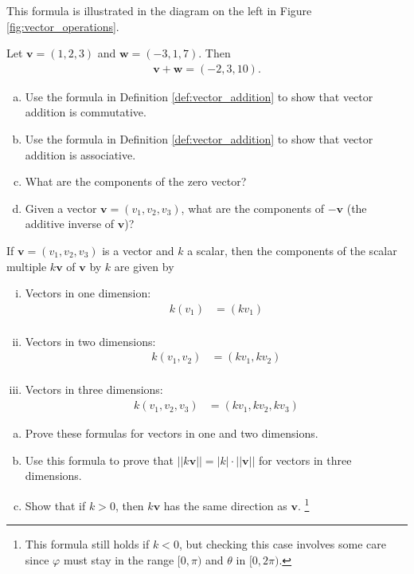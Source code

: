 \documentclass[12pt,letterpaper,reqno]{article}
\numberwithin{equation}{section}
\begin{document}
This formula is illustrated in the diagram on the left in Figure \ref{fig:vector_operations}.

\begin{example}
Let $\mathbf{v}=(1,2,3)$ and $\mathbf{w}=(-3,1,7)$. Then 
\begin{align*}
	\mathbf{v}+\mathbf{w}=(-2,3,10).
\end{align*}	
\end{example}


\begin{exercise}
	\begin{enumerate}[(a)]
		\item Use the formula in Definition \ref{def:vector_addition} to show that vector addition is commutative.
		\item Use the formula in Definition \ref{def:vector_addition} to show that vector addition is associative.
		\item What are the components of the zero vector?
		\item Given a vector $\mathbf{v}=(v_1,v_2,v_3)$, what are the components of $-\mathbf{v}$ (the additive inverse of $\mathbf{v}$)?
	\end{enumerate}
\end{exercise}
\newpage
\begin{prop}\label{prop:scalar_multiple_formula}
If $\mathbf{v}=(v_1,v_2,v_3)$ is a vector and $k$ a scalar, then the components of the scalar multiple $k\mathbf{v}$ of $\mathbf{v}$ by $k$ are given by
\begin{enumerate}[(i)]
	\item Vectors in one dimension:
	\begin{align*}
		k(v_1)&=(kv_1) \\
	\end{align*}
	\item Vectors in two dimensions:
	\begin{align*}
		k(v_1,v_2)&=(kv_1,kv_2) \\
	\end{align*}
	\item Vectors in three dimensions:
	\begin{align*}
		k(v_1,v_2,v_3)&=(kv_1,kv_2,kv_3)
	\end{align*}
\end{enumerate}	
\end{prop}

\begin{exercise}
	\begin{enumerate}[(a)]
		\item Prove these formulas for vectors in one and two dimensions.
		\item Use this formula to prove that $||k\mathbf{v}||=|k| \cdot ||\mathbf{v}||$ for vectors in three dimensions.
		\item Show that if $k>0$, then $k\mathbf{v}$ has the same direction as $\mathbf{v}$. \footnote{This formula still holds if $k<0$, but checking this case involves some care since $\varphi$ must stay in the range $[0,\pi)$ and $\theta$ in $[0,2\pi)$.} 
	\end{enumerate}
\end{exercise}
\end{document}
